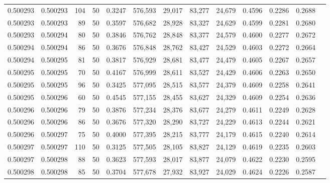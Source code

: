 \begin{tabular}{rrrrrrrrrrrrr}
0.500293 & 0.500293 &   104 &  50 &                                     0.3247 & 576,593 &  29,017 &  83,277 &  24,679 & 0.4596 & 0.2286 & 0.2688 \\
0.500293 & 0.500293 &    89 &  50 &                                     0.3597 & 576,682 &  28,928 &  83,327 &  24,629 & 0.4599 & 0.2281 & 0.2680 \\
0.500293 & 0.500294 &    80 &  50 &                                     0.3846 & 576,762 &  28,848 &  83,377 &  24,579 & 0.4600 & 0.2277 & 0.2672 \\
0.500294 & 0.500294 &    86 &  50 &                                     0.3676 & 576,848 &  28,762 &  83,427 &  24,529 & 0.4603 & 0.2272 & 0.2664 \\
0.500294 & 0.500295 &    81 &  50 &                                     0.3817 & 576,929 &  28,681 &  83,477 &  24,479 & 0.4605 & 0.2267 & 0.2657 \\
0.500295 & 0.500295 &    70 &  50 &                                     0.4167 & 576,999 &  28,611 &  83,527 &  24,429 & 0.4606 & 0.2263 & 0.2650 \\
0.500295 & 0.500295 &    96 &  50 &                                     0.3425 & 577,095 &  28,515 &  83,577 &  24,379 & 0.4609 & 0.2258 & 0.2641 \\
0.500295 & 0.500296 &    60 &  50 &                                     0.4545 & 577,155 &  28,455 &  83,627 &  24,329 & 0.4609 & 0.2254 & 0.2636 \\
0.500296 & 0.500296 &    79 &  50 &                                     0.3876 & 577,234 &  28,376 &  83,677 &  24,279 & 0.4611 & 0.2249 & 0.2628 \\
0.500296 & 0.500296 &    86 &  50 &                                     0.3676 & 577,320 &  28,290 &  83,727 &  24,229 & 0.4613 & 0.2244 & 0.2621 \\
0.500296 & 0.500297 &    75 &  50 &                                     0.4000 & 577,395 &  28,215 &  83,777 &  24,179 & 0.4615 & 0.2240 & 0.2614 \\
0.500297 & 0.500297 &   110 &  50 &                                     0.3125 & 577,505 &  28,105 &  83,827 &  24,129 & 0.4619 & 0.2235 & 0.2603 \\
0.500297 & 0.500298 &    88 &  50 &                                     0.3623 & 577,593 &  28,017 &  83,877 &  24,079 & 0.4622 & 0.2230 & 0.2595 \\
0.500298 & 0.500298 &    85 &  50 &                                     0.3704 & 577,678 &  27,932 &  83,927 &  24,029 & 0.4624 & 0.2226 & 0.2587 \\

\end{tabular}
